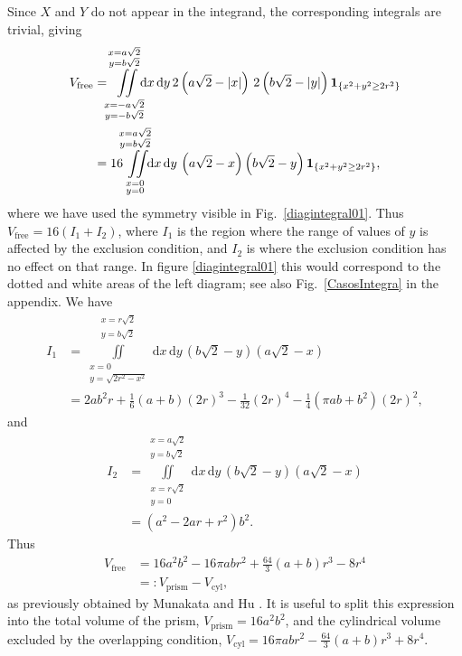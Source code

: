 \documentclass[superscriptaddress,pre,reprint,showpacs,twocolumn]{revtex4-1}
\newcommand{\rd}[1]{\mathrm{d}{#1} \,}
\newcommand{\indicatorsymbol}{\mathbf{1}}
\newcommand{\indicator}[1]{\indicatorsymbol_{ \{   #1 \} } }
\begin{document}
Since $X$ and $Y$ do not appear in the integrand, the corresponding integrals are trivial, giving
\begin{align}
  V_\text{free}  &=
  \iint\limits_{\substack{ x=-a \sqrt{2} \\ y=-b \sqrt{2}}}
  ^{\substack{ x=a \sqrt{2} \\ y=b \sqrt{2}}}
   \mkern-9mu \rd x \rd y 
2 \left( a \sqrt{2} - |x| \right) \, 2 \left( b \sqrt{2} - |y| \right) \indicator{ x^2 + y^2 \ge 2r^2 } \\
&=
16  \iint\limits_{\substack{ x= 0 \\ y=0 }}
  ^{\substack{ x=a \sqrt{2} \\ y=b \sqrt{2}}}
   \mkern-9mu \rd x \rd y  
\left( a \sqrt{2} - x \right) \left( b \sqrt{2} - y \right) \indicator{ x^2 + y^2 \ge 2r^2 },
\end{align}
where we have used the symmetry visible in Fig.~\ref{diagintegral01}.
Thus $V_\text{free} = 16(I_1 + I_2)$, where $I_1$ is the region where the range of
values of $y$
is affected by the exclusion condition, and $I_2$ is where the exclusion condition has
no effect on that range.
 In figure \ref{diagintegral01} this would correspond to the dotted and
white areas of the left diagram; see also Fig.~\ref{CasosIntegra} in the appendix. 
We have
\begin{align}
  I_1 &= \iint\limits_{\substack{x=0  \\ y = \sqrt{ 2r^2 - x^2}}}
    ^{\substack{x=r\sqrt{2}\\ y=b \sqrt{2}}} \! \rd x \rd y
\left( b \sqrt{2} - y \right)  \left( a \sqrt{2} - x \right) \\
&= 	
2 a b^{2} r  + \textstyle \frac{1}{6} (a+b) (2r)^{3} - \frac{1}{32}  (2r)^{4} - \frac{1}{4} {\left(\pi a b + b^{2}\right)} (2r)^2,
\end{align}
and
\begin{align}
  I_2 &= \iint\limits_{\substack{x=r\sqrt{2}  \\ y=0 }}
    ^{\substack{x=a\sqrt{2}\\ y=b \sqrt{2}}} \! \rd x \rd y
  \left( b \sqrt{2} - y \right)  \left( a \sqrt{2} - x \right)  \\
&=	
{\left( a^{2} - 2ar +   r^{2}\right)} b^{2}.
\end{align}
Thus 
\begin{align}\label{volumeabd}
 V_\text{free}
 & =  16 a^{2} b^{2}  - 16 \pi a b r^{2} + \textstyle \frac{64}{3} (a+b) r^{3}  - 8 r^{4} \\
&=: V_\text{prism} - V_\text{cyl},
\end{align}
as previously obtained by Munakata and Hu \cite{Munakata02}.
It is useful to split this expression into the total volume of the prism, 
$V_\text{prism}=16 a^2 b^2$, and the cylindrical volume excluded by the overlapping
condition, 
 $V_\text{cyl} =  16 \pi a b r^{2} - \textstyle \frac{64}{3} (a+b) r^{3}  + 8 r^{4}$.
\end{document}
